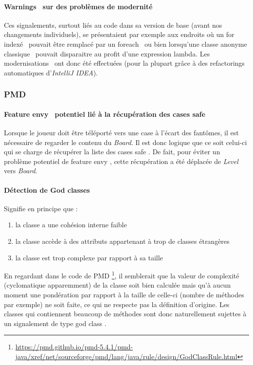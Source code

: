 \documentclass[12pt, openany]{report}
\begin{document}
\paragraph{\og Warnings \fg \, sur des \og problèmes de modernité \fg}
Ces signalements, surtout liés au code dans sa version de base (avant nos changements individuels), se présentaient par exemple aux endroits où un \og for indexé \fg \, pouvait être remplacé par un \og foreach \fg \, ou bien lorsqu'une classe anonyme \og classique \fg \, pouvait disparaitre au profit d'une expression lambda. Les \og modernisations \fg \, ont donc été effectuées (pour la plupart grâce à des \og refactorings \fg \, automatiques d'\textit{IntelliJ IDEA}).

\subsubsection*{PMD}
\paragraph{\og Feature envy \fg \, potentiel lié à la récupération des cases \og safe \fg}
Lorsque le joueur doit être téléporté vers une case à l'écart des fantômes, il est nécessaire de regarder le contenu du \textit{Board}. Il est donc logique que ce soit celui-ci qui se charge de récupérer la liste des cases \og safe \fg . De fait, pour éviter un problème potentiel de \og feature envy \fg , cette récupération a été déplacée de \textit{Level} vers \textit{Board}.
\paragraph{Détection de \og God classes \fg}
Signifie en principe que :
\begin{enumerate}
	\item la classe a une \og cohésion interne \fg faible
	\item la classe accède à des attributs appartenant à trop de classes étrangères
	\item la classe est trop complexe par rapport à sa taille
\end{enumerate}
En regardant dans le code de PMD \footnote{\url{https://pmd.github.io/pmd-5.4.1/pmd-java/xref/net/sourceforge/pmd/lang/java/rule/design/GodClassRule.html}}, il semblerait que la valeur de complexité (cyclomatique apparemment) de la classe soit bien calculée mais qu'à aucun moment une pondération par rapport à la taille de celle-ci (nombre de méthodes par exemple) ne soit faite, ce qui ne respecte pas la définition d'origine.
Les classes qui contiennent beaucoup de méthodes sont donc naturellement sujettes à un signalement de type \og god class \fg.
\end{document}

